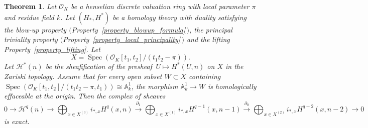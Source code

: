 \documentclass[11pt]{amsart}
\numberwithin{equation}{section}
\newtheorem{theorem}{Theorem}[section]
\newtheorem{Key lemma}[theorem]{Key lemma}
\theoremstyle{definition}
\theoremstyle{remark}
\newcommand{\bb}{\mathbb}
\newcommand{\roi}{\mathcal{O}}
\newcommand{\To}{\longrightarrow}
\newcommand{\cal}{\mathcal}
\DeclareMathOperator{\Spec}{Spec}
\newcommand{\xTo}[1]{\stackrel{#1}{\To}}
\begin{document}
\begin{theorem}\label{theorem_semi_stable}
Let $\cal O_K$ be a henselian discrete valuation ring with local parameter $\pi$ and residue field $k$. Let $(H_*,H^*)$ be a homology theory with duality satisfying the blow-up property $($Property~\ref{property_blowup_formula}\,$)$, the principal triviality property $($Property~\ref{property_local_principality}\,$)$ and the lifting Property~\ref{property_lifting}. 
Let 
$$X=\Spec(\roi_K[t_1,t_2]/(t_1^{}t_{2}^{}-\pi)).$$
Let $\cal H^*(n)$ be the sheafification of the presheaf\, $U\mapsto H^*(U,n)$ on $X$ in the Zariski topology. Assume that for every open subset $W\subset X$ containing $\Spec(\roi_K[t_1,t_2]/(t_1^{}t_{2}^{}-\pi,t_1))\cong \bb A^1_k$, the morphism $ \bb A^1_k\to W$ is homologically effaceable at the origin. Then the complex of sheaves
\begin{equation}\label{equation_Gersten_complex}
0\To \cal H^q(n) \To \bigoplus_{x\in X^{(0)}}i_{*,x}H^{q}(x,n)\xTo{\partial_1} \bigoplus_{x\in X^{(1)}}i_{*,x}H^{q-1}(x,n-1)\xTo{\partial_0} \bigoplus_{x\in X^{(2)}}i_{*,x}H^{q-2}(x,n-2)\To 0 
\end{equation}
is exact.
\end{theorem}
\end{document}
